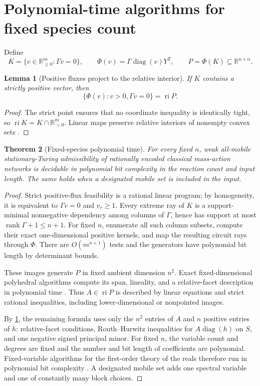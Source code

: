 \documentclass[11pt]{article}
\newtheorem{theorem}{Theorem}[section]
\newtheorem{lemma}[theorem]{Lemma}
\theoremstyle{definition}
\newcommand{\R}{\mathbb R}
\newcommand{\diag}{\operatorname{diag}}
\newcommand{\ri}{\operatorname{ri}}
\newcommand{\rank}{\operatorname{rank}}
\begin{document}
\section{Polynomial-time algorithms for fixed species count}
\label{sec:fixedn}

Define
\[
 K=\{v\in\R_{\geq0}^m:\Gamma v=0\},
 \qquad
 \Phi(v)=\Gamma\diag(v)Y^T,
 \qquad
 P=\Phi(K)\subseteq\R^{n\times n}.
\]

\begin{lemma}[Positive fluxes project to the relative interior]
\label{lem:ri}
If $K$ contains a strictly positive vector, then
\[
 \{\Phi(v):v>0,\Gamma v=0\}=\ri P.
\]
\end{lemma}

\begin{proof}
The strict point ensures that no coordinate inequality is identically tight,
so $\ri K=K\cap\R_{>0}^m$.  Linear maps preserve relative interiors of
nonempty convex sets \cite{Rockafellar1970}.
\end{proof}

\begin{theorem}[Fixed-species polynomial time]
\label{thm:fixedn}
For every fixed $n$, weak all-mobile stationary-Turing admissibility of
rationally encoded classical mass-action networks is decidable in polynomial
bit complexity in the reaction count and input length.  The same holds when a
designated mobile set is included in the input.
\end{theorem}

\begin{proof}
Strict positive-flux feasibility is a rational linear program: by homogeneity,
it is equivalent to $\Gamma v=0$ and $v_r\geq1$.  Every extreme ray of $K$ is
a support-minimal nonnegative dependency among columns of $\Gamma$, hence has
support at most $\rank\Gamma+1\leq n+1$.  For fixed $n$, enumerate all such
column subsets, compute their exact one-dimensional positive kernels, and map
the resulting circuit rays through $\Phi$.  There are $O(m^{n+1})$ tests and
the generators have polynomial bit length by determinant bounds.

These images generate $P$ in fixed ambient dimension $n^2$.  Exact
fixed-dimensional polyhedral algorithms compute its span, lineality, and a
relative-facet description in polynomial time \cite{Schrijver1986}.  Thus
$A\in\ri P$ is described by linear equations and strict rational inequalities,
including lower-dimensional or nonpointed images.

By \cref{lem:ri}, the remaining formula uses only the $n^2$ entries of $A$ and
$n$ positive entries of $h$: relative-facet conditions, Routh--Hurwitz
inequalities for $A\diag(h)$ on $S$, and one negative signed principal minor.
For fixed $n$, the variable count and degrees are fixed and the number and bit
length of coefficients are polynomial.  Fixed-variable algorithms for the
first-order theory of the reals therefore run in polynomial bit complexity
\cite{Renegar1992,BasuPollackRoy2006}.  A designated mobile set adds one
spectral variable and one of constantly many block choices.
\end{proof}
\end{document}
